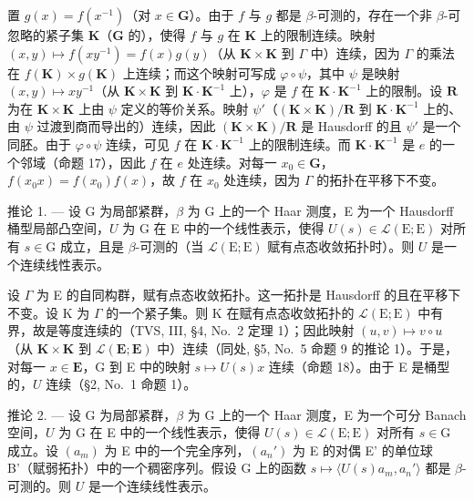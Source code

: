 置 \(g(x) = f(x^{-1})\)（对 \(x \in \mathbf{G}\)）。由于 \(f\) 与 \(g\) 都是 \(\beta\)-可测的，存在一个非 \(\beta\)-可忽略的紧子集 \(\mathbf{K}\)（\(\mathbf{G}\) 的），使得 \(f\) 与 \(g\) 在 \(\mathbf{K}\) 上的限制连续。映射 \((x,y) \mapsto f(xy^{-1}) = f(x)g(y)\)（从 \(\mathbf{K} \times \mathbf{K}\) 到 \(\Gamma\) 中）连续，因为 \(\Gamma\) 的乘法在 \(f(\mathbf{K}) \times g(\mathbf{K})\) 上连续；而这个映射可写成 \(\varphi \circ \psi\)，其中 \(\psi\) 是映射 \((x,y) \mapsto xy^{-1}\)（从 \(\mathbf{K} \times \mathbf{K}\) 到 \(\mathbf{K} \cdot \mathbf{K}^{-1}\) 上），\(\varphi\) 是 \(f\) 在 \(\mathbf{K} \cdot \mathbf{K}^{-1}\) 上的限制。设 \(\mathbf{R}\) 为在 \(\mathbf{K} \times \mathbf{K}\) 上由 \(\psi\) 定义的等价关系。映射 \(\psi'\)（\((\mathbf{K} \times \mathbf{K}) / \mathbf{R}\) 到 \(\mathbf{K} \cdot \mathbf{K}^{-1}\) 上的、由 \(\psi\) 过渡到商而导出的）连续，因此 \((\mathbf{K} \times \mathbf{K}) / \mathbf{R}\) 是 Hausdorff 的且 \(\psi'\) 是一个同胚。由于 \(\varphi \circ \psi\) 连续，可见 \(f\) 在 \(\mathbf{K} \cdot \mathbf{K}^{-1}\) 上的限制连续。而 \(\mathbf{K} \cdot \mathbf{K}^{-1}\) 是 \(e\) 的一个邻域（命题 17），因此 \(f\) 在 \(e\) 处连续。对每一 \(x_0 \in \mathbf{G}\)，\(f(x_0x) = f(x_0)f(x)\)，故 \(f\) 在 \(x_0\) 处连续，因为 \(\Gamma\) 的拓扑在平移下不变。

推论 1. --- 设 G 为局部紧群，\(\beta\) 为 G 上的一个 Haar 测度，E 为一个 Hausdorff 桶型局部凸空间，\(U\) 为 G 在 E 中的一个线性表示，使得 \(U(s) \in \mathcal{L}(\mathrm{E};\mathrm{E})\) 对所有 \(s \in \mathrm{G}\) 成立，且是 \(\beta\)-可测的（当 \(\mathcal{L}(\mathrm{E};\mathrm{E})\) 赋有点态收敛拓扑时）。则 \(U\) 是一个连续线性表示。

设 \(\Gamma\) 为 E 的自同构群，赋有点态收敛拓扑。这一拓扑是 Hausdorff 的且在平移下不变。设 K 为 \(\Gamma\) 的一个紧子集。则 K 在赋有点态收敛拓扑的 \(\mathcal{L}(\mathrm{E};\mathrm{E})\) 中有界，故是等度连续的（TVS, III, §4, No.~2 定理 1）；因此映射 \((u,v)\mapsto v\circ u\)（从 \(\mathbf{K}\times \mathbf{K}\) 到 \(\mathcal{L}(\mathbf{E};\mathbf{E})\) 中）连续（同处, §5, No.~5 命题 9 的推论 1）。于是，对每一 \(x\in \mathbf{E}\)，G 到 E 中的映射 \(s\mapsto U(s)x\) 连续（命题 18）。由于 E 是桶型的，\(U\) 连续（§2, No.~1 命题 1）。

推论 2. --- 设 G 为局部紧群，\(\beta\) 为 G 上的一个 Haar 测度，E 为一个可分 Banach 空间，\(U\) 为 G 在 E 中的一个线性表示，使得 \(U(s) \in \mathcal{L}(\mathrm{E};\mathrm{E})\) 对所有 \(s \in \mathrm{G}\) 成立。设 \((a_m)\) 为 E 中的一个完全序列，\((a_n')\) 为 E 的对偶 E' 的单位球 B'（赋弱拓扑）中的一个稠密序列。假设 G 上的函数 \(s \mapsto \langle U(s)a_m, a_n' \rangle\) 都是 \(\beta\)-可测的。则 \(U\) 是一个连续线性表示。

